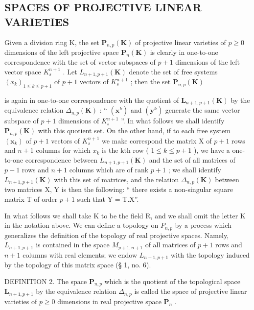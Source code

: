 \subsection{SPACES OF PROJECTIVE LINEAR VARIETIES}

Given a division ring K, the set \(\mathbf{P}_{n,p}(\mathbf{K})\) of projective linear varieties of \(p \geqslant 0\) dimensions of the left projective space \(\mathbf{P}_{n}(\mathbf{K})\) is clearly in one-to-one correspondence with the set of vector subspaces of \(p + 1\) dimensions of the left vector space \(K_{s}^{n+1}\) . Let \(L_{n+1, p+1}(\mathbf{K})\) denote the set of free systems \((x_{k})_{1 \leqslant k \leqslant p+1}\) of \(p + 1\) vectors of \(K_{s}^{n+1}\) ; then the set \(\mathbf{P}_{n,p}(\mathbf{K})\)

is again in one-to-one correspondence with the quotient of \(\mathbf{L}_{n+1,p+1}(\mathbf{K})\) by the equivalence relation \(\Delta_{n,p}(\mathbf{K})\) : `` \((\mathbf{x}^{k})\) and \((\mathbf{y}^{k})\) generate the same vector subspace of \(p+1\) dimensions of \(K_{s}^{n+1}\) ''. In what follows we shall identify \(\mathbf{P}_{n,p}(\mathbf{K})\) with this quotient set. On the other hand, if to each free system \((\mathbf{x}_{k})\) of \(p+1\) vectors of \(K_{s}^{n+1}\) we make correspond the matrix X of \(p+1\) rows and \(n+1\) columns for which \(x_{k}\) is the kth row ( \(1\leqslant k\leqslant p+1\) ), we have a one-to-one correspondence between \(L_{n+1,p+1}(\mathbf{K})\) and the set of all matrices of \(p+1\) rows and \(n+1\) columns which are of rank \(p+1\) ; we shall identify \(L_{n+1,p+1}(\mathbf{K})\) with this set of matrices, and the relation \(\Delta_{n,p}(\mathbf{K})\) between two matrices X, Y is then the following: `` there exists a non-singular square matrix T of order \(p+1\) such that Y = T.X''.

In what follows we shall take K to be the field R, and we shall omit the letter K in the notation above. We can define a topology on \(P_{n,p}\) by a process which generalizes the definition of the topology of real projective spaces. Namely, \(L_{n+1, p+1}\) is contained in the space \(M_{p+1, n+1}\) of all matrices of \(p + 1\) rows and \(n + 1\) columns with real elements; we endow \(L_{n+1, p+1}\) with the topology induced by the topology of this matrix space (§ 1, no. 6).

DEFINITION 2. The space \(\mathbf{P}_{n,p}\) which is the quotient of the topological space \(\mathbf{L}_{n+1,p+1}\) by the equivalence relation \(\Delta_{n,p}\) is called the space of projective linear varieties of \(p\geqslant0\) dimensions in real projective space \(\mathbf{P}_{n}\) .

